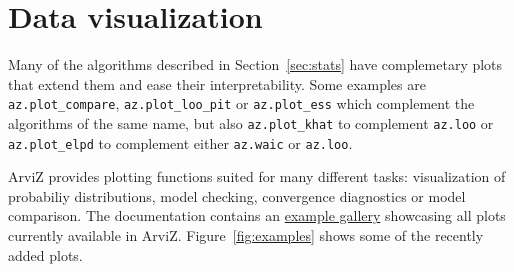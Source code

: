 \documentclass[anonymous=false, %
               format=acmsmall, %
               review=true, %
               screen=true, %
               nonacm=true]{acmart}
\begin{document}
\section{Data visualization}\label{sec:plots}
Many of the algorithms described in Section~\ref{sec:stats} have complemetary
plots that extend them and ease their interpretability. Some
examples are \texttt{az.plot\_compare}, \texttt{az.plot\_loo\_pit} or
\texttt{az.plot\_ess} which complement the algorithms of the same name, but
also \texttt{az.plot\_khat} to complement \texttt{az.loo} or
\texttt{az.plot\_elpd} to complement either \texttt{az.waic} or
\texttt{az.loo}.

ArviZ provides plotting functions suited for many different tasks:
visualization of probabiliy distributions, model checking, convergence
diagnostics or model comparison. The
documentation contains an
\href{https://arviz-devs.github.io/arviz/examples/index.html}{example gallery}
showcasing all plots currently available in ArviZ. Figure~\ref{fig:examples}
shows some of the recently added plots.
\end{document}
